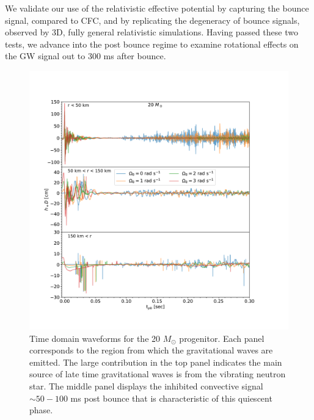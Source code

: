 \documentclass[twocolumn,times]{aastex62}  %
\begin{document}
We validate our use of the relativistic effective potential by capturing the bounce signal, compared to CFC, and by replicating the degeneracy of bounce signals, observed by 3D, fully general relativistic simulations.  Having passed these two tests, we advance into the post bounce regime to examine rotational effects on the GW signal out to 300 ms after bounce.


\begin{figure}[htp]
  \centering     %
  \includegraphics[width=\textwidth]{figures/tdwf_region_20.pdf}
  \caption{Time domain waveforms for the 20 $M_\odot$ progenitor.  Each panel corresponds to the region from which the gravitational waves are emitted.  The large contribution in the top panel indicates the main source of late time gravitational waves is from the vibrating neutron star.  The middle panel displays the inhibited convective signal $\sim 50-100 $ ms post bounce that is characteristic of this quiescent phase.}
  \label{fig:region}
\end{figure}
\end{document}
